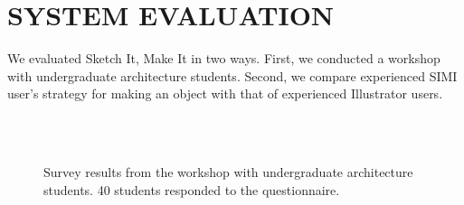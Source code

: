 \documentclass{article}
\begin{document}
\section{SYSTEM EVALUATION}

We evaluated Sketch It, Make It in two ways. First, we conducted a
workshop with undergraduate architecture students. Second, we compare
experienced SIMI user's strategy for making an object with that of
experienced Illustrator users.


\begin{figure}[t]
\centering {}
\\
\\
\caption{Survey results from the workshop with undergraduate
  architecture students. 40 students responded to the questionnaire.}

\label{fig:survey}
\end{figure}
\end{document}
